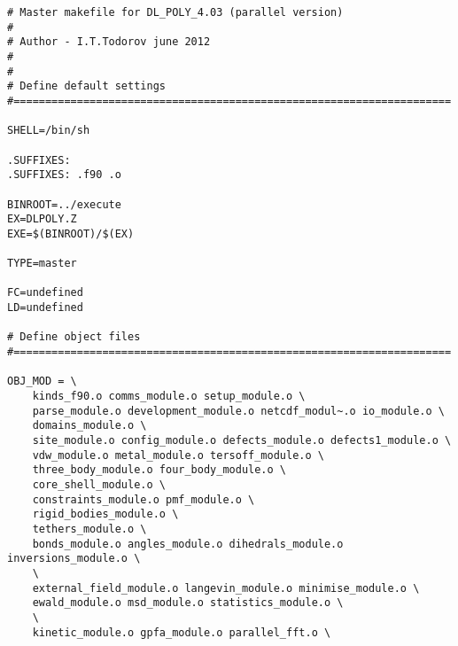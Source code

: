 \begin{verbatim}
# Master makefile for DL_POLY_4.03 (parallel version)
#
# Author - I.T.Todorov june 2012
#
#
# Define default settings
#=====================================================================

SHELL=/bin/sh

.SUFFIXES:
.SUFFIXES: .f90 .o

BINROOT=../execute
EX=DLPOLY.Z
EXE=$(BINROOT)/$(EX)

TYPE=master

FC=undefined
LD=undefined

# Define object files
#=====================================================================

OBJ_MOD = \
	kinds_f90.o comms_module.o setup_module.o \
	parse_module.o development_module.o netcdf_modul~.o io_module.o \
	domains_module.o \
	site_module.o config_module.o defects_module.o defects1_module.o \
	vdw_module.o metal_module.o tersoff_module.o \
	three_body_module.o four_body_module.o \
	core_shell_module.o \
	constraints_module.o pmf_module.o \
	rigid_bodies_module.o \
	tethers_module.o \
	bonds_module.o angles_module.o dihedrals_module.o inversions_module.o \
	\
	external_field_module.o langevin_module.o minimise_module.o \
	ewald_module.o msd_module.o statistics_module.o \
	\
	kinetic_module.o gpfa_module.o parallel_fft.o \


\end{verbatim}
